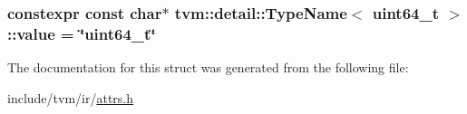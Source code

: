 \subsubsection[{\texorpdfstring{value}{value}}]{\setlength{\rightskip}{0pt plus 5cm}constexpr const char$\ast$ {\bf tvm\+::detail\+::\+Type\+Name}$<$ uint64\+\_\+t $>$\+::value = \char`\"{}uint64\+\_\+t\char`\"{}\hspace{0.3cm}{\ttfamily [static]}}\hypertarget{structtvm_1_1detail_1_1TypeName_3_01uint64__t_01_4_a49e7cec3abbfc4db8144c7a3741b19e6}{}\label{structtvm_1_1detail_1_1TypeName_3_01uint64__t_01_4_a49e7cec3abbfc4db8144c7a3741b19e6}


The documentation for this struct was generated from the following file\+:\begin{DoxyCompactItemize}
\item 
include/tvm/ir/\hyperlink{ir_2attrs_8h}{attrs.\+h}\end{DoxyCompactItemize}
